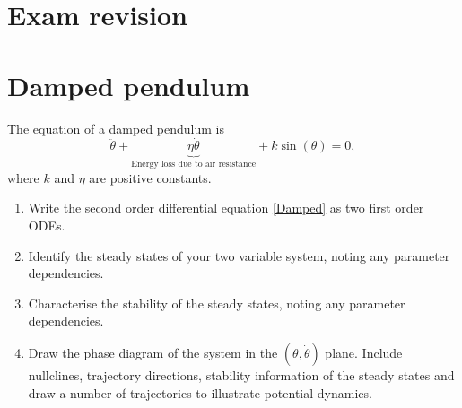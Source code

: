 \documentclass[]{article}
\newcommand{\bb}{\begin{equation}}
\newcommand{\ee}{\end{equation}}
\newcommand{\eqn}[1]{equation \eqref{#1}}
\begin{document}
\section*{Exam revision}
\section{Damped pendulum}
The equation of a damped pendulum is
\bb
\ddot{\theta}+\underbrace{\eta \dot{\theta}}_{\textrm{Energy loss due to air resistance}}+k\sin(\theta)=0,\label{Damped}
\ee
where $k$ and $\eta$ are positive constants.
\begin{enumerate}
\item Write the second order differential \eqn{Damped} as two first order ODEs.
\item Identify the steady states of your two variable system, noting any parameter dependencies.
\item Characterise the stability of the steady states, noting any parameter dependencies.
\item Draw the phase diagram of the system in the $(\theta,\dot{\theta})$ plane. Include nullclines, trajectory directions, stability information of the steady states and draw a number of trajectories to illustrate potential dynamics.
\end{enumerate}
\end{document}
